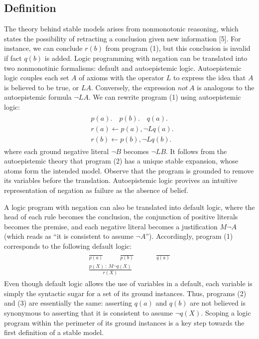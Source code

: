 \subsection{Definition}
The theory behind stable models arises from nonmonotonic reasoning, which states the possibility 
of retracting a conclusion given new information [5]. For instance, we can conclude $r(b)$ from 
program (1), but this conclusion is invalid if fact $q(b)$ is added. Logic programming with 
negation can be translated into two nonmonotinic formalisms: default and autoepistemic logic. 
Autoepistemic logic couples each set $A$ of axioms with the operator $L$ to express the idea that 
$A$ is believed to be true, or $LA$. Conversely, the expression $not \: A$ is analogous to the autoepistemic formula 
$\neg LA$. We can rewrite program (1) using autoepistemic logic:
\begin{align}
    \begin{split}
        & p(a). \hspace{1em} p(b). \hspace{1em} q(a). \\
        & r(a) \leftarrow p(a), \neg Lq(a). \\ 
        & r(b) \leftarrow p(b), \neg Lq(b).
    \end{split}
\end{align}
where each ground negative literal $\neg B$ becomes $\neg LB$. It follows from the 
autoepistemic theory that program (2) has a unique stable expansion, whose atoms 
form the intended model. Observe that the program is 
grounded to remove its variables before the translation. Autoepistemic logic provives an intuitive 
representation of negation as failure as the absence of belief. 

A logic program with negation can also be translated into default logic, where the head 
of each rule becomes the conclusion, the conjunction of positive literals becomes the premise, 
and each negative literal becomes a justification $M \neg A$ (which reads as ``it is consistent to assume $\neg A$''). 
Accordingly, program (1) corresponds to the following default logic:
\begin{align}
    \begin{split}
        \frac{}{p(a)} \hspace{1cm} \frac{}{p(b)} \hspace{1cm} &\frac{}{q(a)} \\ 
        \frac{p(X) \: : \: M \neg q(X)}{r(X)}&
    \end{split}
\end{align}
Even though default logic allows the use of variables in a default, each variable is simply 
the syntactic sugar for a set of its ground instances. Thus, programs (2) and (3) are essentially 
the same: asserting $q(a)$ and $q(b)$ are not believed is synonymous to asserting that it is consistent to assume 
$\neg q(X)$. Scoping a logic program within the perimeter of its ground instances is a key step 
towards the first definition of a stable model. 

